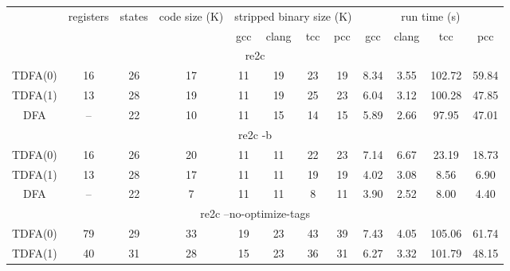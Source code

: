 \documentclass{article}
\newenvironment{Xtab}
    {\par\medskip\noindent\minipage{\linewidth}\begin{center}}
    {\end{center}\endminipage\par\medskip}
\theoremstyle{definition}
\begin{document}
\begin{Xtab}\label{table4}
\begin{center}
    \begin{tabular}{|c|ccccccccccc|}
    \hline
    & registers & states & code size (K) & \multicolumn{4}{c}{stripped binary size (K)} & \multicolumn{4}{c|}{run time (s)} \\
    & & &
        & gcc & clang & tcc & pcc
        & gcc & clang & tcc & pcc \\
    \hline \hline
    \multicolumn{12}{|c|}{re2c} \\
    \hline
    TDFA(0) & 16 & 26 & 17 & 11 & 19 & 23 & 19 & 8.34 & 3.55 & 102.72 & 59.84 \\
    TDFA(1) & 13 & 28 & 19 & 11 & 19 & 25 & 23 & 6.04 & 3.12 & 100.28 & 47.85 \\
    DFA     & -- & 22 & 10 & 11 & 15 & 14 & 15 & 5.89 & 2.66 &  97.95 & 47.01 \\
    \hline \hline
    \multicolumn{12}{|c|}{re2c -b} \\
    \hline
    TDFA(0) & 16 & 26 & 20 & 11 & 11 & 22 & 23 & 7.14 & 6.67 & 23.19 & 18.73 \\
    TDFA(1) & 13 & 28 & 17 & 11 & 11 & 19 & 19 & 4.02 & 3.08 &  8.56 &  6.90 \\
    DFA     & -- & 22 &  7 & 11 & 11 &  8 & 11 & 3.90 & 2.52 &  8.00 &  4.40 \\
    \hline \hline
    \multicolumn{12}{|c|}{re2c --no-optimize-tags} \\
    \hline
    TDFA(0) & 79 & 29 & 33 & 19 & 23 & 43 & 39 & 7.43 & 4.05 & 105.06 & 61.74 \\
    TDFA(1) & 40 & 31 & 28 & 15 & 23 & 36 & 31 & 6.27 & 3.32 & 101.79 & 48.15 \\
    \hline
    \end{tabular}
\end{center}
\end{Xtab}
\end{document}
